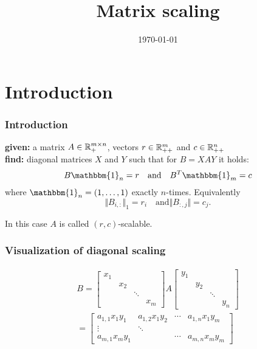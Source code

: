 \documentclass{beamer}
\title{Matrix scaling}
\date{\today}
\begin{document}
\maketitle
\frame{\tableofcontents[currentsection]}

\section{Introduction}%

\begin{frame}
  \frametitle{Introduction}
  \textbf{given:} a matrix $A \in \mathbb{R}^{m\times n}_+$, vectors $r \in \mathbb{R}_{++}^m$ and $c \in \mathbb{R}^n_{++}$\\
  \textbf{find:} diagonal matrices $X$ and $Y$ such that for $B = XAY$ it holds:
  \begin{equation}
    B \mathbbm{1}_n = r \quad \text{and} \quad B^T \mathbbm{1}_m = c
  \end{equation}
  where $\mathbbm{1}_n = (1, \dots, 1)$ exactly $n$-times.
  Equivalently
  \begin{equation}
    \Vert B_{i,:} \Vert_1 = r_i \quad \text{and} \Vert B_{:, j} \Vert = c_j.
  \end{equation}

  \begin{block}{}
    In this case $A$ is called $(r,c)$-scalable.
  \end{block}
\end{frame}

\begin{frame}
  \frametitle{Visualization of diagonal scaling}

  \begin{equation}
    \begin{aligned}
    B = \begin{bmatrix}
      x_1 & & & \\
      & x_2 & & \\
      & & \ddots & \\
      & & & x_m
    \end{bmatrix}
    A
    \begin{bmatrix}
      y_1 & & & \\
      & y_2 & & \\
      & & \ddots & \\
      & & & y_n
    \end{bmatrix}
    \\
    =
    \begin{bmatrix}
      a_{1,1}x_1y_1 & a_{1,2}x_1y_2 & \cdots & a_{1,n} x_1y_m \\
      \vdots   & \ddots & & \\
      a_{m,1}x_m y_1 & & \cdots & a_{m,n}x_m y_m
    \end{bmatrix}
    \end{aligned}
  \end{equation}
\end{frame}
\end{document}
